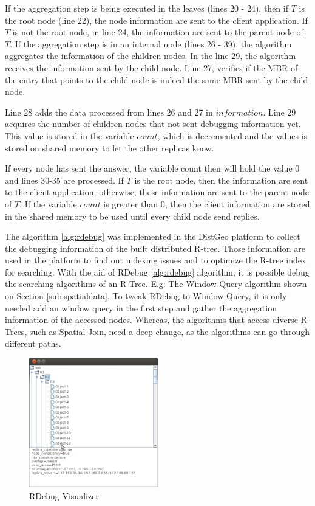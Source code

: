 If the aggregation step is being executed in the leaves (lines 20 - 24), then if  $T$ is the root node (line 22), the node information are sent to the client application. 
If $T$ is not the root node, in line 24, the information are sent to the parent node of $T$. If the aggregation step is in an internal node (lines 26 - 39), the algorithm aggregates the information of the children nodes. 
In the line 29, the algorithm receives the information sent by the child node. Line 27, verifies if the MBR of the entry that points to the child node is indeed the same MBR sent by the child node.
	
Line 28 adds the data processed from lines 26 and 27 in $information$. Line 29 acquires the number of children nodes that not sent debugging information yet. 
This value is stored in the variable $count$, which is decremented and the values is stored on shared memory to let the other replicas know.
	
If every node has sent the answer, the variable count then will hold the value 0 and lines 30-35 are processed. 
If $T$ is the root node, then the information are sent to the client application, otherwise, those information are sent to the parent node of $T$. 
If the variable $count$ is greater than 0, then the client information are stored in the shared memory to be used until every child node send replies.	
	
The algorithm \ref{alg:rdebug} was implemented in the DistGeo platform to collect the debugging information of the built distributed R-tree. 
Those information are used in the platform to find out indexing issues and to optimize the R-tree index for searching. With the aid of RDebug \ref{alg:rdebug} algorithm, it is possible debug the searching algorithms of an R-Tree. 
E.g: The Window Query algorithm shown on Section \ref{sub:spatialdata}. To tweak RDebug to Window Query, it is only needed add an window query in the first step and gather the aggregation information of the accessed nodes. 
Whereas, the algorithms that access diverse R-Trees, such as Spatial Join, need a deep change, as the algorithms can go through different paths.

\begin{figure}[ht]
  \centering
  \includegraphics[width=0.5\textwidth]{rdebug-vis.jpg}
  \caption{RDebug Visualizer}
  \label{fig:rdebug-vis}
\end{figure}

